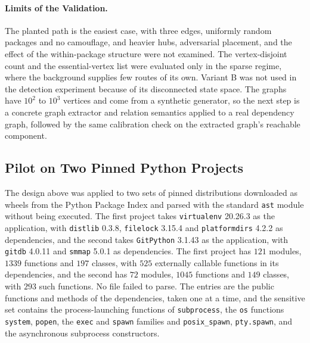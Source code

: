 \documentclass[11pt]{article}
\begin{document}
\paragraph{Limits of the Validation.} The planted path is the easiest case, with three edges, uniformly random packages and no camouflage, and heavier hubs, adversarial placement, and the effect of the within-package structure were not examined. The vertex-disjoint count and the essential-vertex list were evaluated only in the sparse regime, where the background supplies few routes of its own. Variant B was not used in the detection experiment because of its disconnected state space. The graphs have $10^{2}$ to $10^{3}$ vertices and come from a synthetic generator, so the next step is a concrete graph extractor and relation semantics applied to a real dependency graph, followed by the same calibration check on the extracted graph's reachable component.

\subsection{Pilot on Two Pinned Python Projects}

The design above was applied to two sets of pinned distributions downloaded as wheels from the Python Package Index and parsed with the standard \texttt{ast} module without being executed. The first project takes \texttt{virtualenv} 20.26.3 as the application, with \texttt{distlib} 0.3.8, \texttt{filelock} 3.15.4 and \texttt{platformdirs} 4.2.2 as dependencies, and the second takes \texttt{GitPython} 3.1.43 as the application, with \texttt{gitdb} 4.0.11 and \texttt{smmap} 5.0.1 as dependencies. The first project has $121$ modules, $1339$ functions and $197$ classes, with $525$ externally callable functions in its dependencies, and the second has $72$ modules, $1045$ functions and $149$ classes, with $293$ such functions. No file failed to parse. The entries are the public functions and methods of the dependencies, taken one at a time, and the sensitive set contains the process-launching functions of \texttt{subprocess}, the \texttt{os} functions \texttt{system}, \texttt{popen}, the \texttt{exec} and \texttt{spawn} families and \texttt{posix\_spawn}, \texttt{pty.spawn}, and the asynchronous subprocess constructors.
\end{document}
